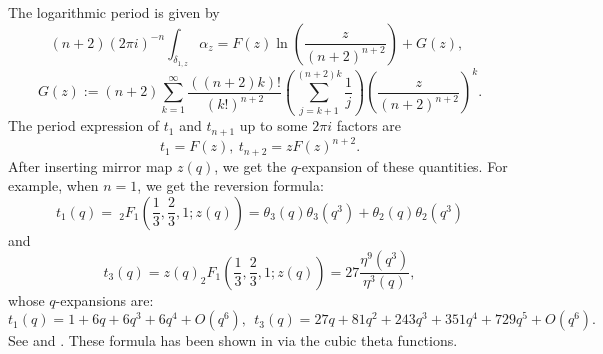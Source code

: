 \documentclass[11pt,leqno]{article}
\newtheorem{coro}{Corollary}
\theoremstyle{remark}
\theoremstyle{definition}
\begin{document}

The logarithmic period is given by 
$$
(n+2)(2\pi i )^{-n}\int_{\delta_{1,z}}\alpha_z=F(z)
\ln(\frac{z}{(n+2)^{n+2}})+G(z),\ \ 
$$
$$
G(z):= (n+2)\sum_{k=1}^{\infty}  \frac{((n+2)k)!}{(k!)^{n+2}} (\sum_{j=k+1}^{(n+2)k}\frac{1}{j}) (\frac{z}{(n+2)^{n+2}})^k.
$$%
The period expression of $t_1$ and $t_{n+1}$ up to some $2\pi i$ factors
are 
$$
t_1=F(z),\ t_{n+2}=zF(z)^{n+2}. 
$$
After inserting mirror map $z(q)$, we get the $q$-expansion of these quantities. For example, when $n=1$, we get the reversion formula:
\[
t_1(q) = \ _2F_1(\frac{1}{3},\frac{2}{3},1;z(q)) = \theta_3(q)\theta_3(q^3)+\theta_2(q)\theta_2(q^3)
\]
and
\[ t_3(q) = z(q) _2F_1(\frac{1}{3},\frac{2}{3},1;z(q)) = 27\frac{\eta^9(q^3)}{\eta^3(q)},\]
whose $q$-expansions are:
$$
t_1(q)= 1+6q+6q^3+6q^4+O\left(q^6\right),\ \   t_3(q)= 27q+81q^2+243q^3+351q^4+729q^5+O\left(q^6\right).\ \ 
$$
See \cite[Section 8]{GMCD-DF} and \cite[Section 5.1]{Younes2019}. These formula has been shown in \cite[Corollary 2.4]{BBG1994} via the cubic theta functions.
\end{document}
